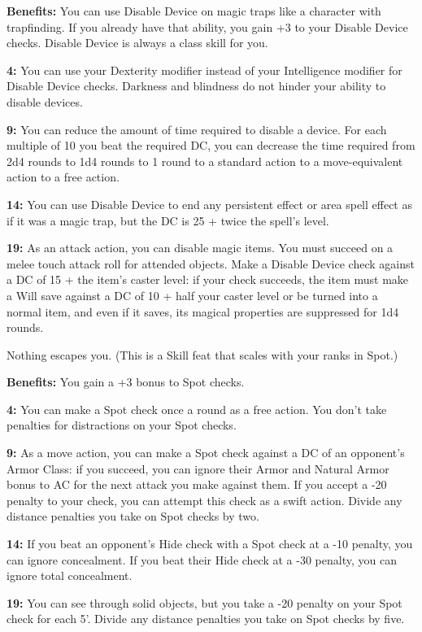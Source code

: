 \textbf{Benefits:} You can use Disable Device on magic traps like a character with trapfinding. If you already have that ability, you gain +3 to your Disable Device checks. Disable Device is always a class skill for you.

\textbf{4:} You can use your Dexterity modifier instead of your Intelligence modifier for Disable Device checks. Darkness and blindness do not hinder your ability to disable devices.

\textbf{9:} You can reduce the amount of time required to disable a device. For each multiple of 10 you beat the required DC, you can decrease the time required from 2d4 rounds to 1d4 rounds to 1 round to a standard action to a move-equivalent action to a free action.

\textbf{14:} You can use Disable Device to end any persistent effect or area spell effect as if it was a magic trap, but the DC is 25 + twice the spell's level.

\textbf{19:} As an attack action, you can disable magic items. You must succeed on a melee touch attack roll for attended objects. Make a Disable Device check against a DC of 15 + the item's caster level: if your check succeeds, the item must make a Will save against a DC of 10 + half your caster level or be turned into a normal item, and even if it saves, its magical properties are suppressed for 1d4 rounds.


Nothing escapes you. (This is a Skill feat that scales with your ranks in Spot.)

\textbf{Benefits:} You gain a +3 bonus to Spot checks.

\textbf{4:} You can make a Spot check once a round as a free action. You don't take penalties for distractions on your Spot checks.

\textbf{9:} As a move action, you can make a Spot check against a DC of an opponent's Armor Class: if you succeed, you can ignore their Armor and Natural Armor bonus to AC for the next attack you make against them. If you accept a -20 penalty to your check, you can attempt this check as a swift action. Divide any distance penalties you take on Spot checks by two.

\textbf{14:} If you beat an opponent's Hide check with a Spot check at a -10 penalty, you can ignore concealment. If you beat their Hide check at a -30 penalty, you can ignore total concealment.

\textbf{19:} You can see through solid objects, but you take a -20 penalty on your Spot check for each 5'. Divide any distance penalties you take on Spot checks by five.

